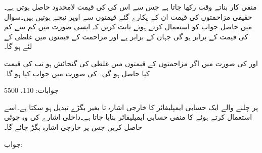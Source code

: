 منفی کار بناتے وقت  رکھا جاتا ہے جس سے  اس کی  کی قیمت لامحدود حاصل ہوتی ہے۔حقیقی مزاحمتوں کی قیمت ان کے پکارے گئے قیمتوں سے اوپر نیچے ہوتیں ہیں۔سوال  میں حاصل جواب کو استعمال کرتے ہوئے ثابت کریں کہ ایسی صورت میں  کم سے کم   کی قیمت  کے برابر ہو گی جہاں  کے برابر ہے اور مزاحمت کے قیمتوں میں  غلطی کے لئے  ہو گا۔

 اور  کی صورت میں اگر مزاحمتوں کے قیمتوں میں   غلطی کی گنجائش ہو تب   کی قیمت کیا حاصل ہو گی۔ کی صورت میں جواب کیا ہو گا۔ 

جوابات: 110،  5500

 پر چلنے والے ایک حسابی ایمپلیفائر کا خارجی اشارہ  تا   بغیر بگڑے تبدیل ہو سکتا ہے۔اسے استعمال کرتے ہوئے  کا منفی حسابی ایمپلیفائر بنایا جاتا ہے۔داخلی اشارے کی وہ چوٹی  حاصل کریں جس پر خارجی اشارہ بگڑ جائے گا۔

جواب: 

